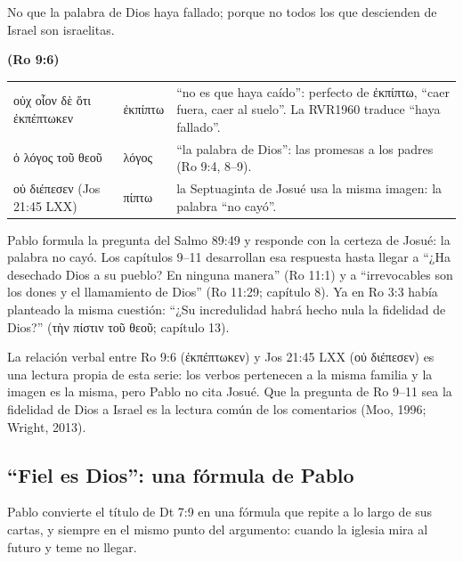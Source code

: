 \documentclass[11pt,letterpaper]{article}
\newcommand{\grc}[1]{\foreignlanguage{ancientgreek}{#1}}
\newcommand{\fuente}[1]{\par\hfill{\upshape\bfseries\small\textcolor{azul}{#1}}}
\begin{document}
\begin{cita}No que la palabra de Dios haya fallado; porque no todos los que descienden de Israel son israelitas.\fuente{(Ro 9:6)}\end{cita}

\begin{filologia}[Ro 9:6]
\begin{tabular}{@{}L{3.2cm}L{1.6cm}L{10cm}@{}}
\grc{οὐχ οἷον δὲ ὅτι ἐκπέπτωκεν} & \grc{ἐκπίπτω} & ``no es que haya caído'': perfecto de \grc{ἐκπίπτω}, ``caer fuera, caer al suelo''. La RVR1960 traduce ``haya fallado''. \\[2pt]
\grc{ὁ λόγος τοῦ θεοῦ} & \grc{λόγος} & ``la palabra de Dios'': las promesas a los padres (Ro 9:4, 8--9). \\[2pt]
\grc{οὐ διέπεσεν} (Jos 21:45 LXX) & \grc{πίπτω} & la Septuaginta de Josué usa la misma imagen: la palabra ``no cayó''. \\
\end{tabular}
\end{filologia}

Pablo formula la pregunta del Salmo 89:49 y responde con la certeza de Josué: la palabra no cayó. Los capítulos 9--11 desarrollan esa respuesta hasta llegar a ``¿Ha desechado Dios a su pueblo? En ninguna manera'' (Ro 11:1) y a ``irrevocables son los dones y el llamamiento de Dios'' (Ro 11:29; capítulo 8). Ya en Ro 3:3 había planteado la misma cuestión: ``¿Su incredulidad habrá hecho nula la fidelidad de Dios?'' (\grc{τὴν πίστιν τοῦ θεοῦ}; capítulo 13).

\begin{nota}[Precisión]
La relación verbal entre Ro 9:6 (\grc{ἐκπέπτωκεν}) y Jos 21:45 LXX (\grc{οὐ διέπεσεν}) es una lectura propia de esta serie: los verbos pertenecen a la misma familia y la imagen es la misma, pero Pablo no cita Josué. Que la pregunta de Ro 9--11 sea la fidelidad de Dios a Israel es la lectura común de los comentarios (Moo, 1996; Wright, 2013).
\end{nota}

\subsection{``Fiel es Dios'': una fórmula de Pablo}
Pablo convierte el título de Dt 7:9 en una fórmula que repite a lo largo de sus cartas, y siempre en el mismo punto del argumento: cuando la iglesia mira al futuro y teme no llegar.
\end{document}
